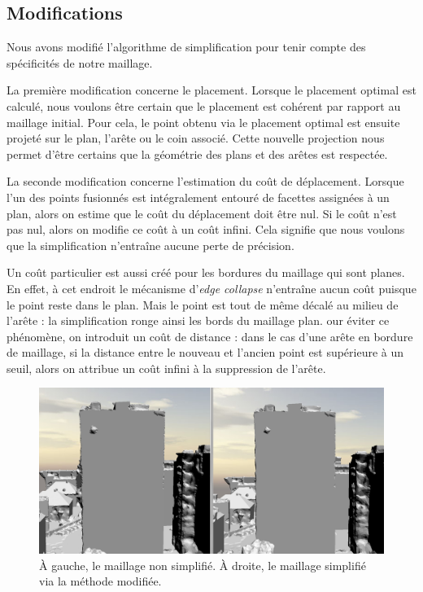 ﻿\documentclass[12pt, twoside]{article}
\begin{document}
\subsection{Modifications}
Nous avons modifié l'algorithme de simplification pour tenir compte des spécificités de notre maillage.

La première modification concerne le placement. Lorsque le placement optimal est calculé, nous voulons être certain que le placement est cohérent par rapport au maillage initial. Pour cela, le point obtenu via le placement optimal est ensuite projeté sur le plan, l'arête ou le coin associé. Cette nouvelle projection nous permet d'être certains que la géométrie des plans et des arêtes est respectée.

La seconde modification concerne l'estimation du coût de déplacement. Lorsque l'un des points fusionnés est intégralement entouré de facettes assignées à un plan, alors on estime que le coût du déplacement doit être nul. Si le coût n'est pas nul, alors on modifie ce coût à un coût infini. Cela signifie que nous voulons que la simplification n'entraîne aucune perte de précision.

Un coût particulier est aussi créé pour les bordures du maillage qui sont planes. En effet, à cet endroit le mécanisme d'\textit{edge collapse} n'entraîne aucun coût puisque le point reste dans le plan. Mais le point est tout de même décalé au milieu de l'arête : la simplification ronge ainsi les bords du maillage plan. our éviter ce phénomène, on introduit un coût de distance : dans le cas d'une arête en bordure de maillage, si la distance entre le nouveau et l'ancien point est supérieure à un seuil, alors on attribue un coût infini à la suppression de l'arête.

\begin{figure}[h]
\centering
\includegraphics[scale=0.33]{Simpli2.png}
\caption{\label{fig:simpl2} À gauche, le maillage non simplifié. À droite, le maillage simplifié via la méthode modifiée.}
\end{figure}
\end{document}
